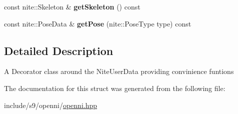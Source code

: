 \begin{DoxyCompactItemize}
\item 
\hypertarget{structs9_1_1oni_1_1OpenNISkeleton_1_1User_a994d5151d6c3d63d28c1bb5c08c43343}{const nite\-::\-Skeleton \& {\bfseries get\-Skeleton} () const }\label{structs9_1_1oni_1_1OpenNISkeleton_1_1User_a994d5151d6c3d63d28c1bb5c08c43343}

\item 
\hypertarget{structs9_1_1oni_1_1OpenNISkeleton_1_1User_a83106313b47ab927cd320b92fc33b34d}{const nite\-::\-Pose\-Data \& {\bfseries get\-Pose} (nite\-::\-Pose\-Type type) const }\label{structs9_1_1oni_1_1OpenNISkeleton_1_1User_a83106313b47ab927cd320b92fc33b34d}

\end{DoxyCompactItemize}


\subsection{\-Detailed \-Description}
\-A \-Decorator class around the \-Nite\-User\-Data providing convinience funtions 

\-The documentation for this struct was generated from the following file\-:\begin{DoxyCompactItemize}
\item 
include/s9/openni/\hyperlink{openni_8hpp}{openni.\-hpp}\end{DoxyCompactItemize}

